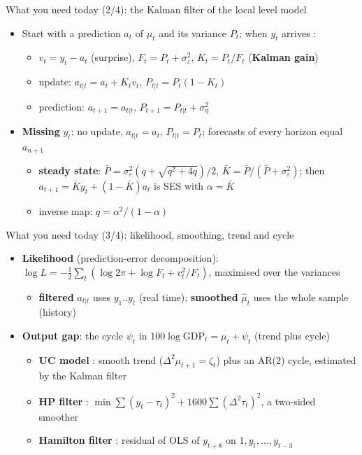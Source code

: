 \begin{frame}{What you need today (2/4): the Kalman filter of the local level model}
\itemsize{\small}
\begin{itemize}
    \item Start with a prediction $a_t$ of $\mu_t$ and its variance $P_t$; when $y_t$ arrives :
    \begin{itemize}
        \item $v_t = y_t - a_t$ (surprise), \quad $F_t = P_t + \sigma^2_\varepsilon$, \quad $K_t = P_t/F_t$ (\textbf{Kalman gain})
        \item update: $a_{t|t} = a_t + K_tv_t$, \quad $P_{t|t} = P_t(1 - K_t)$
        \item prediction: $a_{t+1} = a_{t|t}$, \quad $P_{t+1} = P_{t|t} + \sigma^2_\eta$
    \end{itemize}
    \item \textbf{Missing} $y_t$: no update, $a_{t|t} = a_t$, $P_{t|t} = P_t$; forecasts of every horizon equal $a_{n+1}$
    \begin{itemize}
        \item \textbf{steady state}: $\bar P = \sigma^2_\varepsilon(q + \sqrt{q^2 + 4q})/2$, $\bar K = \bar P/(\bar P + \sigma^2_\varepsilon)$; then $a_{t+1} = \bar Ky_t + (1 - \bar K)a_t$ is SES with $\alpha = \bar K$ 
        \item inverse map: $q = \alpha^2/(1 - \alpha)$
    \end{itemize}
\end{itemize}
\end{frame}

\begin{frame}{What you need today (3/4): likelihood, smoothing, trend and cycle}
\itemsize{\small}
\begin{itemize}
    \item \textbf{Likelihood} (prediction-error decomposition): $\log L = -\frac12\sum_t(\log 2\pi + \log F_t + v_t^2/F_t)$, maximised over the variances
    \begin{itemize}
        \item \textbf{filtered} $a_{t|t}$ uses $y_1..y_t$ (real time); \textbf{smoothed} $\hat\mu_t$ uses the whole sample (history) 
    \end{itemize}
    \item \textbf{Output gap}: the cycle $\psi_t$ in $100\log\mathrm{GDP}_t = \mu_t + \psi_t$ (trend plus cycle)
    \begin{itemize}
        \item \textbf{UC model} : smooth trend ($\Delta^2\mu_{t+1} = \zeta_t$) plus an AR(2) cycle, estimated by the Kalman filter
        \item \textbf{HP filter} : $\min\sum(y_t - \tau_t)^2 + 1600\sum(\Delta^2\tau_t)^2$, a two-sided smoother
        \item \textbf{Hamilton filter} : residual of OLS of $y_{t+8}$ on $1, y_t, \dots, y_{t-3}$
    \end{itemize}
\end{itemize}
\end{frame}

